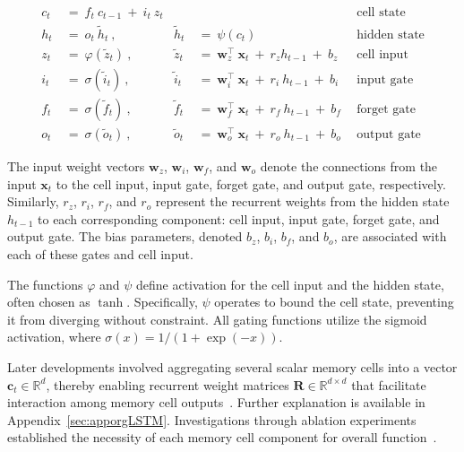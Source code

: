 \begin{align}
c_t \ &= \  f_t \ c_{t-1} \ + \ i_t \ z_t &  & &\text{cell state} \\
h_t  \ &= \ o_t \ \tilde{h}_t \ , & \tilde{h}_t \ &= \ \psi \left( c_t\right)
  &\text{hidden state} \\
z_t \ &= \ \varphi \left( \tilde{z}_t \right) \ , 
  &\tilde{z}_t \ &=  \ \mathbf{w}^\top_{z} \ \mathbf{x}_t \ + \
  r_{z}  h_{t-1} \ + \  b_{z} \ \
  &\text{cell input} \\
i_t \ &= \ \sigma \left( \tilde{i}_t  \right) \ , 
  &\tilde{i}_t \ &= \ \mathbf{w}^\top_{i} \ \mathbf{x}_t \ + \
  r_{i}  \ h_{t-1} \ + \  b_{i} \ \
  &\text{input gate} \\
f_t \ &= \ \sigma \left(  \tilde{f}_t \right) \ , 
  &\tilde{f}_t \ &= \ \mathbf{w}^\top_{f} \ \mathbf{x}_t  \ + \
  r_{f}  \ h_{t-1} \ + \  b_{f} \ \
  &\text{forget gate} \\
o_t \ &= \ \sigma \left( \tilde{o}_t \right) \ , 
  &\tilde{o}_t  \ &= \ \mathbf{w}^\top_{o} \ \mathbf{x}_t \ + \
  r_{o}  \ h_{t-1} \ + \  b_{o} \ \
  &\text{output gate} 
\end{align}

The input weight vectors $\mathbf{w}_{z}$, $\mathbf{w}_{i}$, $\mathbf{w}_{f}$, and $\mathbf{w}_{o}$ denote the connections from the input $\mathbf{x}_t$ to the cell input, input gate, forget gate, and output gate, respectively. Similarly, $r_{z}$, $r_{i}$, $r_{f}$, and $r_{o}$ represent the recurrent weights from the hidden state $h_{t-1}$ to each corresponding component: cell input, input gate, forget gate, and output gate. The bias parameters, denoted $b_{z}$, $b_{i}$, $b_{f}$, and $b_{o}$, are associated with each of these gates and cell input.

The functions $\varphi$ and $\psi$ define activation for the cell input and the hidden state, often chosen as $\tanh$. Specifically, $\psi$ operates to bound the cell state, preventing it from diverging without constraint. All gating functions utilize the sigmoid activation, where $\sigma\left(x\right)=1/(1+\exp(-x))$.

Later developments involved aggregating several scalar memory cells into a vector $\mathbf{c}_t \in \mathbb{R}^{d}$, thereby enabling recurrent weight matrices $\mathbf{R} \in \mathbb{R}^{d \times d}$ that facilitate interaction among memory cell outputs~\citep{Greff:15}. Further explanation is available in Appendix~\ref{sec:apporgLSTM}. Investigations through ablation experiments established the necessity of each memory cell component for overall function~\citep{Greff:15}.

